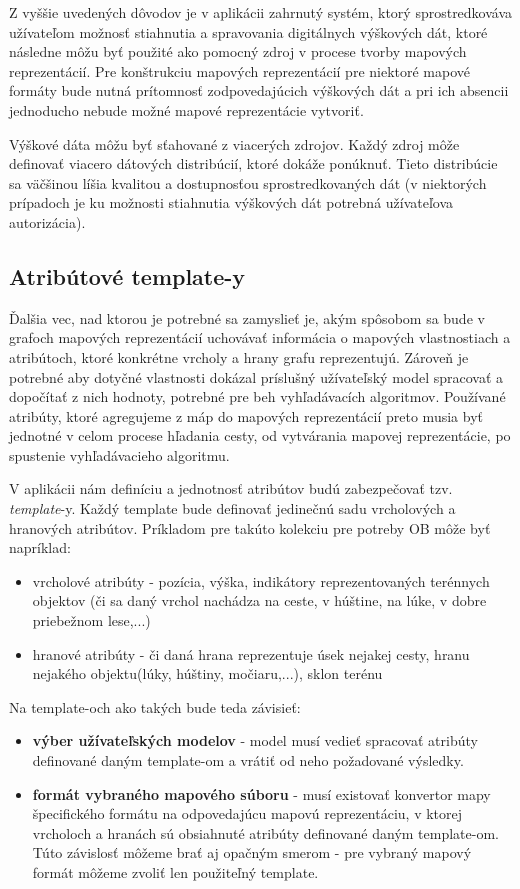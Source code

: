 Z vyššie uvedených dôvodov je v aplikácii zahrnutý systém, ktorý sprostredkováva užívateľom možnosť stiahnutia a spravovania digitálnych výškových dát, ktoré následne môžu byť použité ako pomocný zdroj v procese tvorby mapových reprezentácií. Pre konštrukciu mapových reprezentácií pre niektoré mapové formáty bude nutná prítomnosť zodpovedajúcich výškových dát a pri ich absencii jednoducho nebude možné mapové reprezentácie vytvoriť.

Výškové dáta môžu byť sťahované z viacerých zdrojov. Každý zdroj môže definovať viacero dátových distribúcií, ktoré dokáže ponúknuť. Tieto distribúcie sa väčšinou líšia kvalitou a dostupnosťou sprostredkovaných dát (v niektorých prípadoch je ku možnosti stiahnutia výškových dát potrebná užívateľova autorizácia).

\subsection{Atribútové template-y}\label{templatey}

Ďalšia vec, nad ktorou je potrebné sa zamyslieť je, akým spôsobom sa bude v grafoch mapových reprezentácií uchovávať informácia o mapových vlastnostiach a atribútoch, ktoré konkrétne vrcholy a hrany grafu reprezentujú. Zároveň je potrebné aby dotyčné vlastnosti dokázal príslušný užívateľský model spracovať a dopočítať z nich hodnoty, potrebné pre beh vyhľadávacích algoritmov. Používané atribúty, ktoré agregujeme z máp do mapových reprezentácií preto musia byť jednotné v celom procese hľadania cesty, od vytvárania mapovej reprezentácie, po spustenie vyhľadávacieho algoritmu.

V aplikácii nám definíciu a jednotnosť atribútov budú zabezpečovať tzv. \textit{template}-y. Každý template bude definovať jedinečnú sadu vrcholových a hranových atribútov. Príkladom pre takúto kolekciu pre potreby OB môže byť napríklad:
\begin{itemize}
    \item vrcholové atribúty - pozícia, výška, indikátory reprezentovaných terénnych objektov (či sa daný vrchol nachádza na ceste, v húštine, na lúke, v dobre priebežnom lese,...)
    \item hranové atribúty - či daná hrana reprezentuje úsek nejakej cesty, hranu nejakého objektu(lúky, húštiny, močiaru,...), sklon terénu
\end{itemize}

Na template-och ako takých bude teda závisieť: 
\begin{itemize}
    \item \textbf{výber užívateľských modelov} - model musí vedieť spracovať atribúty definované daným template-om a vrátiť od neho požadované výsledky.
    \item \textbf{formát vybraného mapového súboru} - musí existovať konvertor mapy špecifického formátu na odpovedajúcu mapovú reprezentáciu, v ktorej vrcholoch a hranách sú obsiahnuté atribúty definované daným template-om. Túto závislosť môžeme brať aj opačným smerom - pre vybraný mapový formát môžeme zvoliť len použiteľný template.
\end{itemize}

